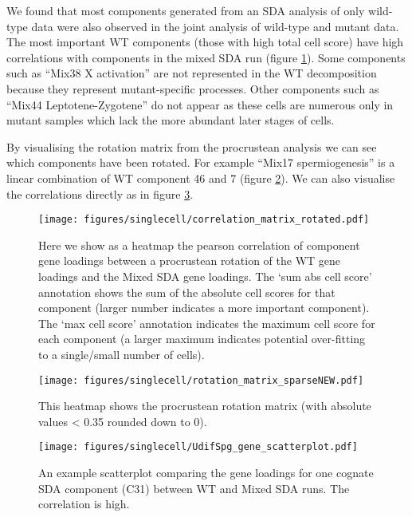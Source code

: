 We found that most components generated from an SDA analysis of only wild-type data were also observed in the joint analysis of wild-type and mutant data.
The most important WT components (those with high total cell score) have high correlations with components in the mixed SDA run (figure \ref{fig:WT_vs_Mixed}).
Some components such as ``Mix38 X activation'' are not represented in the WT decomposition because they represent mutant-specific processes.
Other components such as ``Mix44 Leptotene-Zygotene'' do not appear as these cells are numerous only in mutant samples which lack the more abundant later stages of cells.

By visualising the rotation matrix from the procrustean analysis we can see which components have been rotated.
For example ``Mix17 spermiogenesis'' is a linear combination of WT component 46 and 7 (figure \ref{fig:WT_Mix_Rotation}).
We can also visualise the correlations directly as in figure \ref{fig:WT_Mix_Correlation}.

\begin{figure}[H]
	\centering
	\texttt{[image: figures/singlecell/correlation\_matrix\_rotated.pdf]}
	\caption[Wild Type vs Mixed SDA]{Here we show as a heatmap the pearson correlation of component gene loadings between a procrustean rotation of the WT gene loadings and the Mixed SDA gene loadings.
		The ‘sum abs cell score’ annotation shows the sum of the absolute cell scores for that component (larger number indicates a more important component).
		The ‘max cell score’ annotation indicates the maximum cell score for each component (a larger maximum indicates potential over-fitting to a single/small number of cells).}
	\label{fig:WT_vs_Mixed}
\end{figure}

\begin{figure}[H]
	\centering
	\texttt{[image: figures/singlecell/rotation\_matrix\_sparseNEW.pdf]}
	\caption[Procrustean Rotation Matrix]{This heatmap shows the procrustean rotation matrix (with absolute values < 0.35 rounded down to 0).}
	\label{fig:WT_Mix_Rotation}
\end{figure}

\begin{figure}[H]
	\centering
	\texttt{[image: figures/singlecell/UdifSpg\_gene\_scatterplot.pdf]}
	\caption[Component 31 WT vs Mixed]{An example scatterplot comparing the gene loadings for one cognate SDA component (C31) between WT and Mixed SDA runs. The correlation is high.}
	\label{fig:WT_Mix_Correlation}
\end{figure}

